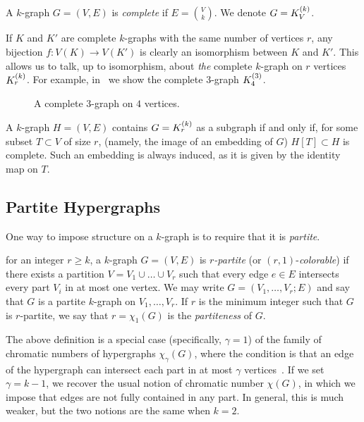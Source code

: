 \begin{definition} \label{def:complete}
    A $k$-graph $G = (V, E)$ is \emph{complete} if $E = \binom{V}{k}$.
    We denote $G = K^{(k)}_{V}$.
\end{definition}

If $K$ and $K'$ are complete $k$-graphs with the same number of vertices $r$,
any bijection $f: V(K) \to V(K')$ is clearly an isomorphism between $K$ and $K'$.
This allows us to talk, up to isomorphism, about \emph{the} complete $k$-graph on $r$ vertices $K^{(k)}_{r}$.
For example, in~ we show the complete $3$-graph $K^{(3)}_{4}$.

\begin{figure}[htbp]
    \centering
    
    \caption{A complete $3$-graph on $4$ vertices.}
    \label{fig:complete_kgraph}
\end{figure}

\begin{remark}
    A $k$-graph $H = (V, E)$ contains $G = K^{(k)}_{r}$ as a subgraph if and only if,
    for some subset $T \subset V$ of size $r$, (namely, the image of an embedding of $G$)
    $H[T] \subset H$ is complete.
    Such an embedding is always induced, as it is given by the identity map on $T$.
\end{remark}

\subsection{Partite Hypergraphs}\label{subsec:partite}

One way to impose structure on a $k$-graph is to require that it is \emph{partite}.

\begin{definition} \label{def:partite}
    for an integer $r \geq k$, a $k$-graph $G = (V, E)$ is \emph{$r$-partite}
    (or $(r, 1)$-\emph{colorable})
    if there exists a partition $V = V_1 \cup \dots \cup V_r$
    such that every edge $e \in E$ intersects every part $V_i$ in at most one vertex.
    We may write $G = (V_1, \dots, V_r; E)$ and say that
    $G$ is a partite $k$-graph on $V_1, \dots, V_r$.
    If $r$ is the minimum integer such that $G$ is $r$-partite,
    we say that $r = \chi_{1}(G)$ is the \emph{partiteness} of $G$.
\end{definition}

The above definition is a special case (specifically, $\gamma = 1$)
of the family of chromatic numbers of hypergraphs $\chi_{\gamma}(G)$,
where the condition is that an edge of the hypergraph can intersect each part in at most
$\gamma$ vertices~\cite{krivelevich1998chromatic}.
If we set $\gamma = k - 1$, we recover the usual notion of chromatic number $\chi(G)$,
in which we impose that edges are not fully contained in any part.
In general, this is much weaker, but the two notions are the same when $k = 2$.


